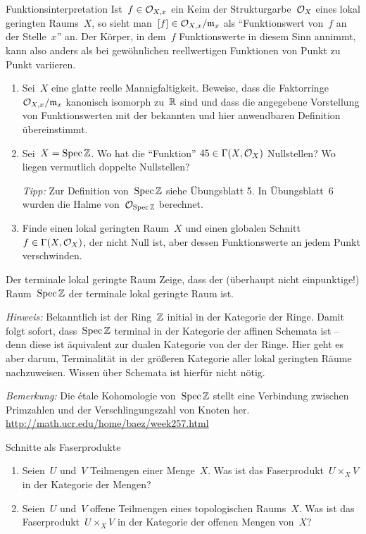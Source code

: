 \documentclass{uebblatt}
\begin{document}
\begin{aufgabe}{Funktionsinterpretation}
Ist~$f \in \mathcal{O}_{X,x}$ ein Keim der Strukturgarbe~$\mathcal{O}_X$ eines lokal geringten
Raums~$X$, so sieht man~$[f] \in \mathcal{O}_{X,x}/\mathfrak{m}_x$ als "`Funktionswert von~$f$ an
der Stelle~$x$"' an. Der Körper, in dem~$f$ Funktionswerte in diesem Sinn
annimmt, kann also anders als bei gewöhnlichen reellwertigen Funktionen von
Punkt zu Punkt variieren.
\begin{enumerate}
\item Sei~$X$ eine glatte reelle Mannigfaltigkeit. Beweise, dass die
Faktorringe~$\mathcal{O}_{X,x}/\mathfrak{m}_x$ kanonisch isomorph zu~$\mathbb{R}$ sind und dass die
angegebene Vorstellung von Funktionswerten mit der bekannten und hier
anwendbaren Definition übereinstimmt.
\item Sei~$X = \operatorname{Spec} \mathbb{Z}$. Wo hat die "`Funktion"' $45 \in \Gamma(X,\mathcal{O}_X)$
Nullstellen? Wo liegen vermutlich doppelte Nullstellen?

\emph{Tipp:} Zur Definition von~$\operatorname{Spec}\mathbb{Z}$ siehe Übungsblatt 5. In
Übungsblatt~6 wurden die Halme von~$\mathcal{O}_{\operatorname{Spec}\mathbb{Z}}$ berechnet.
\item Finde einen lokal geringten Raum~$X$ und einen globalen Schnitt~$f \in
\Gamma(X,\mathcal{O}_X)$, der nicht Null ist, aber dessen Funktionswerte an jedem Punkt
verschwinden.
\end{enumerate}
\end{aufgabe}

\newpage

\begin{aufgabe}{Der terminale lokal geringte Raum}
Zeige, dass der (überhaupt nicht einpunktige!) Raum~$\operatorname{Spec} \mathbb{Z}$ der terminale
lokal geringte Raum ist.

\emph{Hinweis:} Bekanntlich ist der Ring~$\mathbb{Z}$ initial in der Kategorie der
Ringe. Damit folgt sofort, dass~$\operatorname{Spec}\mathbb{Z}$ terminal in der Kategorie der
affinen Schemata ist -- denn diese ist äquivalent zur dualen Kategorie von der
der Ringe. Hier geht es aber darum, Terminalität in der größeren Kategorie
aller lokal geringten Räume nachzuweisen. Wissen über Schemata ist hierfür
nicht nötig.

{\scriptsize
\emph{Bemerkung:} Die étale Kohomologie von~$\operatorname{Spec}\mathbb{Z}$ stellt eine Verbindung
zwischen Primzahlen und der Verschlingungszahl von Knoten her.
\url{http://math.ucr.edu/home/baez/week257.html}\par}
\end{aufgabe}

\begin{aufgabe}{Schnitte als Faserprodukte}
\begin{enumerate}
\item Seien~$U$ und~$V$ Teilmengen einer Menge~$X$. Was ist das Faserprodukt~$U
\times_X V$ in der Kategorie der Mengen?
\item Seien~$U$ und~$V$ offene Teilmengen eines topologischen Raums~$X$. Was
ist das Faserprodukt~$U \times_X V$ in der Kategorie der offenen Mengen
von~$X$?
\end{enumerate}
\end{aufgabe}
\end{document}
